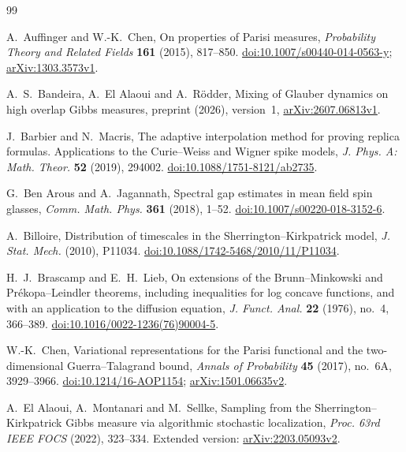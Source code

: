 \begin{thebibliography}{99}

A.~Auffinger and W.-K.~Chen,
\newblock On properties of Parisi measures,
\newblock \emph{Probability Theory and Related Fields}
\textbf{161} (2015), 817--850.
\newblock \href{https://doi.org/10.1007/s00440-014-0563-y}{doi:10.1007/s00440-014-0563-y};
\href{https://arxiv.org/abs/1303.3573v1}{arXiv:1303.3573v1}.

A.~S.~Bandeira, A.~El Alaoui and A.~R\"odder,
\newblock Mixing of Glauber dynamics on high overlap Gibbs measures,
\newblock preprint (2026), version~1, \href{https://arxiv.org/abs/2607.06813v1}{arXiv:2607.06813v1}.

J.~Barbier and N.~Macris,
\newblock The adaptive interpolation method for proving replica formulas.
Applications to the Curie--Weiss and Wigner spike models,
\newblock \emph{J. Phys. A: Math. Theor.} \textbf{52} (2019), 294002.
\newblock \href{https://doi.org/10.1088/1751-8121/ab2735}{doi:10.1088/1751-8121/ab2735}.

G.~Ben Arous and A.~Jagannath,
\newblock Spectral gap estimates in mean field spin glasses,
\newblock \emph{Comm. Math. Phys.} \textbf{361} (2018), 1--52.
\newblock \href{https://doi.org/10.1007/s00220-018-3152-6}{doi:10.1007/s00220-018-3152-6}.

A.~Billoire,
\newblock Distribution of timescales in the Sherrington--Kirkpatrick model,
\newblock \emph{J. Stat. Mech.} (2010), P11034.
\newblock \href{https://doi.org/10.1088/1742-5468/2010/11/P11034}{doi:10.1088/1742-5468/2010/11/P11034}.

H.~J.~Brascamp and E.~H.~Lieb,
\newblock On extensions of the Brunn--Minkowski and Pr\'ekopa--Leindler theorems,
including inequalities for log concave functions, and with an application to the diffusion equation,
\newblock \emph{J. Funct. Anal.} \textbf{22} (1976), no.~4, 366--389.
\newblock \mbox{\href{https://doi.org/10.1016/0022-1236(76)90004-5}{doi:10.1016/0022-1236(76)90004-5}}.

W.-K.~Chen,
\newblock Variational representations for the Parisi functional and
the two-dimensional Guerra--Talagrand bound,
\newblock \emph{Annals of Probability} \textbf{45} (2017),
no.~6A, 3929--3966.
\newblock \href{https://doi.org/10.1214/16-AOP1154}{doi:10.1214/16-AOP1154};
\href{https://arxiv.org/abs/1501.06635v2}{arXiv:1501.06635v2}.

A.~El Alaoui, A.~Montanari and M.~Sellke,
\newblock Sampling from the Sherrington--Kirkpatrick Gibbs measure via
algorithmic stochastic localization,
\newblock \emph{Proc. 63rd IEEE FOCS} (2022), 323--334.
\newblock Extended version: \href{https://arxiv.org/abs/2203.05093v2}{arXiv:2203.05093v2}.


\end{thebibliography}

